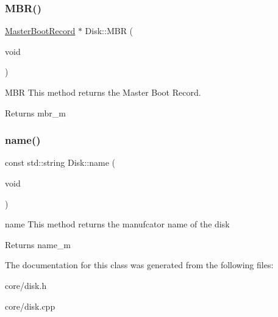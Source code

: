 \subsubsection{\texorpdfstring{M\+B\+R()}{MBR()}}
{\footnotesize\ttfamily \mbox{\hyperlink{classcore_1_1disk_1_1_master_boot_record}{Master\+Boot\+Record}} $\ast$ Disk\+::\+M\+BR (\begin{DoxyParamCaption}\item[{void}]{ }\end{DoxyParamCaption})}



M\+BR This method returns the Master Boot Record. 

\begin{DoxyReturn}{Returns}
mbr\+\_\+m 
\end{DoxyReturn}
\mbox{\label{classcore_1_1disk_1_1_disk_a889c305501805431f1189f179d8281ca}} 
\subsubsection{\texorpdfstring{name()}{name()}}
{\footnotesize\ttfamily const std\+::string Disk\+::name (\begin{DoxyParamCaption}\item[{void}]{ }\end{DoxyParamCaption})}



name This method returns the manufcator name of the disk 

\begin{DoxyReturn}{Returns}
name\+\_\+m 
\end{DoxyReturn}


The documentation for this class was generated from the following files\+:\begin{DoxyCompactItemize}
\item 
core/disk.\+h\item 
core/disk.\+cpp\end{DoxyCompactItemize}
